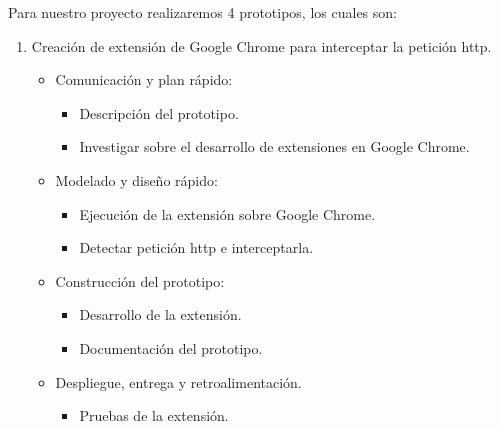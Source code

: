 \documentclass[12pt, a4paper, titlepage]{report}
\begin{document}
        Para nuestro proyecto realizaremos 4 prototipos, los cuales son: 
        \begin{enumerate}
        
        
            \item Creación de extensión de Google Chrome para interceptar la petición \acrshort{http}. 
            \begin{itemize}
                \item Comunicación y plan rápido: 
                \begin{itemize}
                    \item Descripción del prototipo.
                    \item Investigar sobre el desarrollo de extensiones en Google Chrome.
                \end{itemize}
                \item Modelado y diseño rápido:
                \begin{itemize}
                    \item Ejecución de la extensión sobre Google Chrome.
                    \item Detectar petición \acrshort{http} e interceptarla.
                \end{itemize}
                \item Construcción del prototipo: 
                \begin{itemize}
                    \item Desarrollo de la extensión.
                    \item Documentación del prototipo.
                \end{itemize}
                \item Despliegue, entrega y retroalimentación.
                \begin{itemize}
                    \item Pruebas de la extensión.
                \end{itemize}
            \end{itemize}
            

\end{enumerate}
\end{document}
